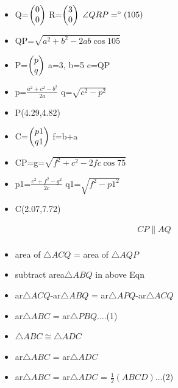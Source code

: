 \begin{frame}
\begin{itemize}
\item Q=$\begin{pmatrix}0\\0\end{pmatrix}$    R=$\begin{pmatrix}3\\0\end{pmatrix}$   $\angle{QRP}=\degree(105)$\\
\item QP=$\sqrt{a^2+b^2-2ab\cos{105}}$
\item P=$\begin{pmatrix}p\\q\end{pmatrix}$  a=3, b=5 c=QP\\
\item p=$\frac{a^2+c^2-b^2}{2a}$    q=$\sqrt{c^2-p^2}$\\
\item P(4.29,4.82)
\item C=$\begin{pmatrix}p1\\q1\end{pmatrix}$  f=b+a\\
\item CP=g=$\sqrt{f^2+c^2-2fc\cos{75}}$
\item p1=$\frac{c^2+f^2-g^2}{2c}$    q1=$\sqrt{f^2-p1^2}$\\
\item C(2.07,7.72)
\end{itemize}
\end{frame}
\begin{frame}
\begin{align*}
CP \parallel AQ\\
\end{align*}
\begin{itemize}
\item area of $\triangle{ACQ}$ =  area of $\triangle{AQP}$\\

\item subtract area$\triangle{ABQ}$ in above Eqn\\

\item ar$\triangle{ACQ}$-ar$\triangle{ABQ}$ = ar$\triangle{APQ}$-ar$\triangle{ACQ}$\\

\item ar$\triangle{ABC}$ = ar$\triangle{PBQ}$....(1)\\

\item $\triangle{ABC} \cong \triangle{ADC}$\\

\item ar$\triangle{ABC}$ = ar$\triangle{ADC}$\\

\item ar$\triangle{ABC}$ = ar$\triangle{ADC}$ = $\frac{1}{2}(ABCD)$...(2)\\
\end{itemize}
\end{frame}
